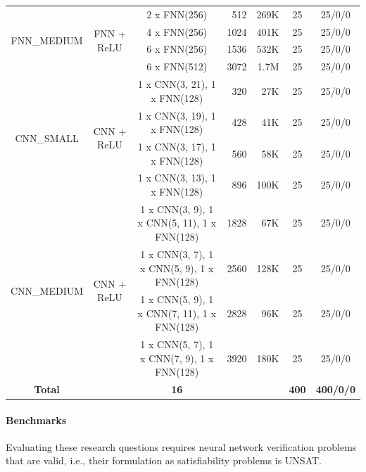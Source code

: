 \documentclass[oneside,11pt,dvipsnames]{book}
\begin{document}
{\begin{table}[t]
\begin{tabular}{c|ccrr|cc}
        \midrule
        \multirow{4}{*}{FNN\_MEDIUM}        & \multirow{4}{*}{FNN + ReLU} & 2 x FNN(256)  &    512 &  269K & 25 & 25/0/0 \\
                                            &                             & 4 x FNN(256)  &   1024 &  401K & 25 & 25/0/0 \\
                                            &                             & 6 x FNN(256)  &   1536 &  532K & 25 & 25/0/0 \\
                                            &                             & 6 x FNN(512)  &   3072 & 1.7M & 25 & 25/0/0 \\
        \midrule
        \multirow{4}{*}{CNN\_SMALL}         & \multirow{4}{*}{CNN + ReLU} & 1 x CNN(3, 21), 1 x FNN(128)  &   320 & 27K & 25 & 25/0/0 \\
                                            &                             & 1 x CNN(3, 19), 1 x FNN(128)  &   428 & 41K & 25 & 25/0/0 \\
                                            &                             & 1 x CNN(3, 17), 1 x FNN(128)  &   560 & 58K & 25 & 25/0/0 \\
                                            &                             & 1 x CNN(3, 13), 1 x FNN(128)  &   896 & 100K & 25 & 25/0/0 \\
        \midrule
        \multirow{4}{*}{CNN\_MEDIUM}        & \multirow{4}{*}{CNN + ReLU} & 1 x CNN(3, 9), 1 x CNN(5, 11), 1 x FNN(128)  &   1828 & 67K & 25 & 25/0/0 \\
                                            &                             & 1 x CNN(3, 7), 1 x CNN(5, 9),  1 x FNN(128)  &   2560 & 128K & 25 & 25/0/0 \\
                                            &                             & 1 x CNN(5, 9), 1 x CNN(7, 11), 1 x FNN(128)  &   2828 & 96K & 25 & 25/0/0 \\
                                            &                             & 1 x CNN(5, 7), 1 x CNN(7, 9),  1 x FNN(128)  &   3920 & 180K & 25 & 25/0/0 \\
        \midrule
        \textbf{Total}                      &                             & \textbf{16}                  &     &   & \textbf{400} & \textbf{400/0/0} \\
        \bottomrule
    \end{tabular}
\end{table}
}


\paragraph{Benchmarks}
Evaluating these research questions requires neural network verification problems
that are valid, i.e., their formulation as satisfiability problems is UNSAT.
\end{document}
